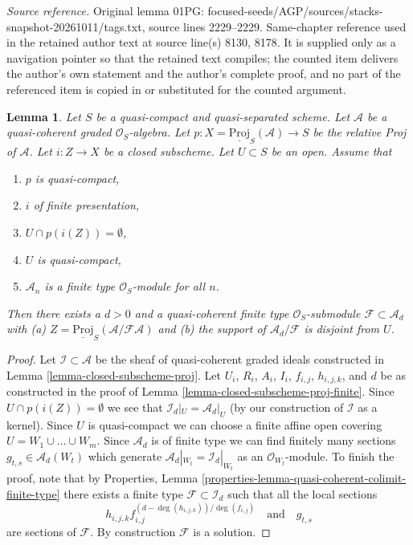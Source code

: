 \documentclass[10pt,a4paper]{amsart}
\theoremstyle{plain}
\newtheorem{lemma}[subsection]{Lemma}
\theoremstyle{definition}
\theoremstyle{remark}
\numberwithin{equation}{subsection}
\begin{document}
\noindent\textit{Source reference.} Original lemma 01PG: focused-seeds/AGP/sources/stacks-snapshot-20261011/tags.txt, source lines 2229--2229. Same-chapter reference used in the retained author text at source line(s) 8130, 8178. It is supplied only as a navigation pointer so that the retained text compiles; the counted item delivers the author's own statement and the author's complete proof, and no part of the referenced item is copied in or substituted for the counted argument.\par\medskip
\begin{lemma}
\label{lemma-closed-subscheme-proj-finite-type}
Let $S$ be a quasi-compact and quasi-separated scheme.
Let $\mathcal{A}$ be a quasi-coherent graded $\mathcal{O}_S$-algebra.
Let $p : X = \underline{\text{Proj}}_S(\mathcal{A}) \to S$ be the relative
Proj of $\mathcal{A}$. Let $i : Z \to X$ be a closed subscheme.
Let $U \subset S$ be an open. Assume that
\begin{enumerate}
\item $p$ is quasi-compact,
\item $i$ of finite presentation,
\item $U \cap p(i(Z)) = \emptyset$,
\item $U$ is quasi-compact,
\item $\mathcal{A}_n$ is a finite type $\mathcal{O}_S$-module for all $n$.
\end{enumerate}
Then there exists a $d > 0$ and a quasi-coherent finite type
$\mathcal{O}_S$-submodule $\mathcal{F} \subset \mathcal{A}_d$ with (a)
$Z = \underline{\text{Proj}}_S(\mathcal{A}/\mathcal{F}\mathcal{A})$
and (b) the support of $\mathcal{A}_d/\mathcal{F}$ is disjoint from $U$.
\end{lemma}

\begin{proof}
Let $\mathcal{I} \subset \mathcal{A}$ be the sheaf of quasi-coherent
graded ideals constructed in Lemma \ref{lemma-closed-subscheme-proj}.
Let $U_i$, $R_i$, $A_i$, $I_i$, $f_{i, j}$, $h_{i, j, k}$, and $d$
be as constructed in the proof of
Lemma \ref{lemma-closed-subscheme-proj-finite}.
Since $U \cap p(i(Z)) = \emptyset$ we see that
$\mathcal{I}_d|_U = \mathcal{A}_d|_U$ (by our construction of
$\mathcal{I}$ as a kernel). Since $U$ is quasi-compact we
can choose a finite affine open covering $U = W_1 \cup \ldots \cup W_m$.
Since $\mathcal{A}_d$ is of finite type we can find finitely many sections
$g_{t, s} \in \mathcal{A}_d(W_t)$ which generate
$\mathcal{A}_d|_{W_t} = \mathcal{I}_d|_{W_t}$
as an $\mathcal{O}_{W_t}$-module. To finish the proof, note that by
Properties, Lemma \ref{properties-lemma-quasi-coherent-colimit-finite-type}
there exists a finite type $\mathcal{F} \subset \mathcal{I}_d$
such that all the local sections
$$
h_{i, j, k}f_{i, j}^{(d - \deg(h_{i, j, k}))/\deg(f_{i, j})}
\quad\text{and}\quad
g_{t, s}
$$
are sections of $\mathcal{F}$. By construction $\mathcal{F}$ is a solution.
\end{proof}
\end{document}
